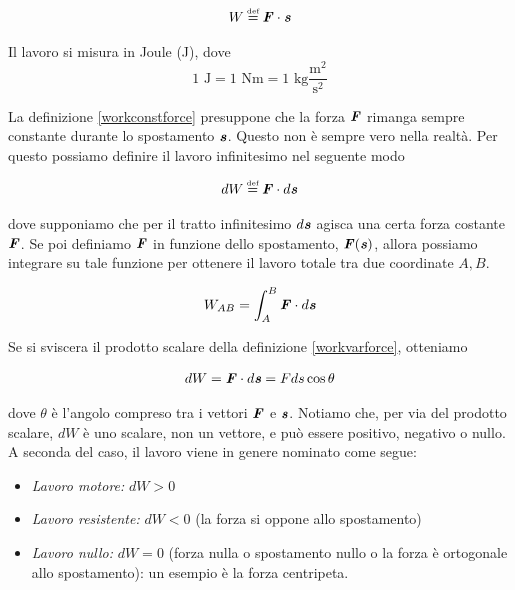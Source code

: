 \begin{align}
W \eqdef \vecsymb{F}\cdot\vecsymb{s}\label{workconstforce}
\end{align}

\noindent Il lavoro si misura in Joule (J), dove
\[ 1\text{ J} = 1\text{ Nm} = 1\text{ kg$\frac{\text{m}^2}{\text{s}^2}$} \]

La definizione \ref{workconstforce} presuppone che la forza $\textbf{\textit{F}}$
rimanga sempre constante durante lo spostamento $\textbf{\textit{s}}$. Questo non è
sempre vero nella realtà. Per questo possiamo definire il lavoro infinitesimo
nel seguente modo

\begin{align}
    dW \eqdef \vecsymb{F} \cdot d\vecsymb{s}\label{workvarforce}
\end{align}

\noindent dove supponiamo che per il tratto infinitesimo $d\textbf{\textit{s}}$ agisca
una certa forza costante $\textbf{\textit{F}}$. Se poi definiamo $\textbf{\textit{F}}$ in
funzione dello spostamento, $\textbf{\textit{F}}(\textbf{\textit{s}})$, allora possiamo integrare
su tale funzione per ottenere il lavoro totale tra due coordinate $A,B$.

\begin{align}
    W_{AB} = \int_{A}^{B}\textbf{\textit{F}}\cdot d\textbf{\textit{s}}
\end{align}

\noindent Se si sviscera il prodotto scalare della definizione \ref{workvarforce},
otteniamo

\begin{align}
    dW = \textbf{\textit{F}}\cdot d\textbf{\textit{s}} = Fds\cos\theta\label{lavoroinfinitesimoangolo}
\end{align}

\noindent dove $\theta$ è l'angolo compreso tra i vettori $\textbf{\textit{F}}$
e $\textbf{\textit{s}}$. Notiamo che, per via del prodotto scalare, $dW$ è uno scalare, non un vettore, e
può essere positivo, negativo o nullo. A seconda del caso, il lavoro
viene in genere nominato come segue:

\begin{itemize}
    \item \textit{Lavoro motore:} $dW > 0$
    \item \textit{Lavoro resistente:} $dW < 0$ (la forza si oppone allo spostamento)
    \item \textit{Lavoro nullo:} $dW = 0$ (forza nulla o spostamento nullo o la forza è ortogonale allo spostamento): un
    esempio è la forza centripeta.
\end{itemize}

